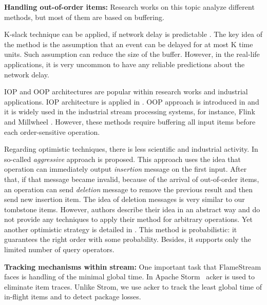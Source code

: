 {\bf Handling out-of-order items:}
Research works on this topic analyze different methods, but most of them are based on buffering.

K-slack technique can be applied, if network delay is predictable \cite{Babu:2004:EKC:1016028.1016032, Li:2007:ESP:1270388.1270975}. The key idea of the method is the assumption that an event can be delayed for at most K time units. Such assumption can reduce the size of the buffer. However, in the real-life applications, it is very uncommon to have any reliable predictions about the network delay.

IOP and OOP architectures are popular within research works and industrial applications. IOP architecture is applied in \cite{Cranor:2003:GSD:872757.872838, Abadi:2003:ANM:950481.950485, Arasu:2006:CCQ:1146461.1146463, Ding:2004:EWJ:1031171.1031189, Hammad:2003:SSW:1315451.1315478, Hammad:2005:OIE:1116877.1116897}. OOP approach is introduced in \cite{Li:2008:OPN:1453856.1453890} and it is widely used in the industrial stream processing systems, for instance, Flink \cite{carbone2015apache} and Millwheel \cite{Akidau:2013:MFS:2536222.2536229}. However, these methods require buffering all input items before each order-sensitive operation.

Regarding optimistic techniques, there is less scientific and industrial activity. In \cite{Wei:2009:SSO:1559845.1559973} so-called {\it aggressive} approach is proposed. This approach uses the idea that operation can immediately output {\it insertion} message on the first input. After that, if that message became invalid, because of the arrival of out-of-order items, an operation can send {\it deletion} message to remove the previous result and then send new insertion item. The idea of deletion messages is very similar to our tombstone items. However, authors describe their idea in an abstract way and do not provide any techniques to apply their method for arbitrary operations. Yet another optimistic strategy is detailed in \cite{Li2011}. This method is probabilistic: it guarantees the right order with some probability. Besides, it supports only the limited number of query operators.

{\bf Tracking mechanisms within stream:}
One important task that FlameStream faces is handling of the minimal global time. In Apache Storm~\cite{apache:storm} acker is used to eliminate item traces. Unlike Strom, we use acker to track the least global time of in-flight items and to detect package losses.
